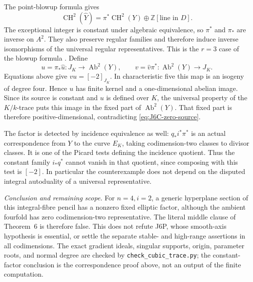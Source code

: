 The point-blowup formula gives
\[
 \operatorname{CH}^2(\widehat Y)
    =\pi^*\operatorname{CH}^2(Y)\oplus\mathbb Z[\text{line in }D].
\]
The exceptional integer is constant under algebraic
equivalence, so $\pi^*$ and $\pi_*$ are inverse on $A^2$.
They also preserve regular families and therefore induce
inverse isomorphisms of the universal regular
representatives. This is the $r=3$ case of the blowup
formula \cite[Theorem 2.8(3)]{DGJ_Jiang2023}.
Define
\[
 u=\pi_*\widehat u:J_K\longrightarrow\operatorname{Ab}^2(Y),
 \qquad
 v=\widehat v\pi^*:\operatorname{Ab}^2(Y)\longrightarrow J_K.
\]
Equations above give $vu=[-2]_{J_K}$. In characteristic
five this map is an isogeny of degree four. Hence $u$ has
finite kernel and a one-dimensional abelian image. Since
its source is constant and $u$ is defined over $K$, the
universal property of the $K/k$-trace puts this image in
the fixed part of $\operatorname{Ab}^2(Y)$. That fixed
part is therefore positive-dimensional, contradicting
\eqref{eq:J6C-zero-source}.

The factor is detected by incidence equivalence as well:
$q_*i^*\pi^*$ is an actual correspondence from $Y$ to the
curve $E_K$, taking codimension-two classes to divisor
classes. It is one of the Picard tests defining the
incidence quotient. Thus the constant family $i_*q^*$
cannot vanish in that quotient, since composing with
this test is $[-2]$. In particular the counterexample
does not depend on the disputed integral autoduality
of a universal representative.

\emph{Conclusion and remaining scope.}
For $n=4,i=2$, a generic hyperplane section of this
integral-fibre pencil has a nonzero fixed elliptic
factor, although the ambient fourfold has zero
codimension-two representative. The literal middle
clause of Theorem~6 is therefore false. This does not
refute J6P, whose smooth-axis hypothesis is essential,
or settle the separate stable- and high-range assertions
in all codimensions. The exact gradient ideals,
singular supports, origin, parameter roots, and normal
degree are checked by \texttt{check\_cubic\_trace.py};
the constant-factor conclusion is the correspondence
proof above, not an output of the finite computation.
